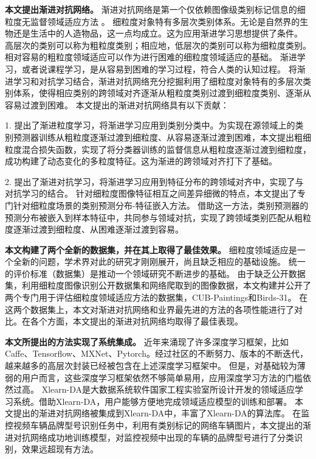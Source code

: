 \textbf{本文提出渐进对抗网络。}
渐进对抗网络是第一个仅依赖图像级类别标记信息的细粒度无监督领域适应方法 \cite{wangprogressive}。
细粒度对象特有多层次类别体系。无论是自然界的生物还是生活中的人造物品，这一点均成立。这为应用渐进学习思想提供了条件。
高层次的类别可以称为粗粒度类别；相应地，低层次的类别可以称为细粒度类别。相对容易的粗粒度领域适应可以作为进行困难的细粒度领域适应的基础。
渐进学习，或者说课程学习\cite{bengio2009curriculum}，是从容易到困难的学习过程，符合人类的认知过程。
将渐进学习和对抗学习结合，渐进对抗网络充分挖掘利用了细粒度对象特有的多层次类别体系，使得相应类别的跨领域对齐逐渐从粗粒度类别过渡到细粒度类别、逐渐从容易过渡到困难。
本文提出的渐进对抗网络具有以下贡献：

1. 提出了渐进粒度学习，将渐进学习应用到类别分类中。为实现在源领域上的类别预测器训练从粗粒度逐渐过渡到细粒度、从容易逐渐过渡到困难，本文提出粗细粒度混合损失函数，实现了将分类器训练的监督信息从粗粒度逐渐过渡到细粒度，成功构建了动态变化的多粒度特征。这为渐进的跨领域对齐打下了基础。
 
2. 提出了渐进对抗学习，将渐进学习应用到特征分布的跨领域对齐中，实现了与对抗学习的结合。
针对细粒度图像特征相互之间差异细微的特点，本文提出了专门针对细粒度场景的类别预测分布-特征嵌入方法。
借助这一方法，类别预测器的预测分布被嵌入到样本特征中，共同参与领域对抗，实现了跨领域类别匹配从粗粒度逐渐过渡到细粒度、从困难逐渐过渡到容易。


\textbf{本文构建了两个全新的数据集，并在其上取得了最佳效果。}
细粒度领域适应是一个全新的问题，学术界对此的研究才刚刚展开，尚且缺乏相应的基础设施。
统一的评价标准（数据集）是推动一个领域研究不断进步的基础。
由于缺乏公开数据集，利用细粒度图像识别公开数据集和网络爬取到的图像数据，本文构建并公开了两个专门用于评估细粒度领域适应方法的数据集，CUB-Paintings和Birds-31。
在这两个数据集上，本文对渐进对抗网络和业界最先进的方法的各项性能进行了对比。在各个方面，本文提出的渐进对抗网络均取得了最佳表现。

\textbf{本文所提出的方法实现了系统集成。}
近年来涌现了许多深度学习框架，比如Caffe\cite{jia2014caffe}、Tensorflow\cite{abadi2016tensorflow}、MXNet\cite{chen2015mxnet}、Pytorch\cite{paszke2019pytorch}。经过社区的不断努力、版本的不断迭代，越来越多的高层次封装已经被包含在上述深度学习框架中。
但是，对基础较为薄弱的用户而言，这些深度学习框架依然不够简单易用，应用深度学习方法的门槛依然过高。
Xlearn-DA是大数据系统软件国家工程实验室所设计开发的领域适应学习系统。借助Xlearn-DA，用户能够方便地完成领域适应模型的训练和部署。
本文提出的渐进对抗网络被集成到Xlearn-DA中，丰富了Xlearn-DA的算法库。
在监控视频车辆品牌型号识别任务中，利用有类别标记的网络车辆图片，本文提出的渐进对抗网络成功地训练模型，对监控视频中出现的车辆的品牌型号进行了分类识别，效果远超现有方法。

